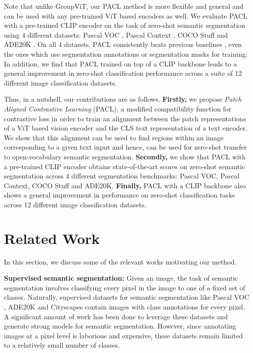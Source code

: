 \documentclass[10pt,twocolumn,letterpaper]{article}
\begin{document}
Note that unlike GroupViT, our PACL method is more flexible and general and can be used with any pre-trained ViT based encoders as well. We evaluate PACL with a pre-trained CLIP encoder on the task of zero-shot semantic segmentation using 4 different datasets: Pascal VOC \cite{Everingham10}, Pascal Context \cite{mottaghi_cvpr14}, COCO Stuff \cite{caesar2018coco} and ADE20K \cite{zhou2017scene}. On all 4 datasets, PACL consistently beats previous baselines \cite{li2022language, ghiasi2021open, liu2022open, xu2022groupvit}, even the ones which use segmentation annotations or segmentation masks for training. In addition, we find that PACL trained on top of a CLIP backbone leads to a general improvement in zero-shot classification performance across a suite of 12 different image classification datasets.

Thus, in a nutshell, our contributions are as follows. \textbf{Firstly,} we propose \emph{Patch Aligned Contrastive Learning} (PACL), a modified compatibility function for contrastive loss in order to train an alignment between the patch representations of a ViT based vision encoder and the CLS text representation of a text encoder. We show that this alignment can be used to find regions within an image corresponding to a given text input and hence, can be used for zero-shot transfer to open-vocabulary semantic segmentation. \textbf{Secondly,} we show that PACL with a pre-trained CLIP encoder obtains state-of-the-art scores on zero-shot semantic segmentation across 4 different segmentation benchmarks: Pascal VOC, Pascal Context, COCO Stuff and ADE20K. \textbf{Finally,} PACL with a CLIP backbone also shows a general improvement in performance on zero-shot classification tasks across 12 different image classification datasets.

\section{Related Work}
\label{sec:related_work}

In this section, we discuss some of the relevant works motivating our method.

\textbf{Supervised semantic segmentation:} Given an image, the task of semantic segmentation \cite{Long_2015_CVPR} involves classifying every pixel in the image to one of a fixed set of classes. Naturally, supervised datasets for semantic segmentation like Pascal VOC \cite{Everingham10}, ADE20K \cite{zhou2017scene} and Cityscapes \cite{cordts2016cityscapes} contain images with class annotations for every pixel. A significant amount of work \cite{ronneberger2015u, chen2017rethinking, wang2020deep, zhao2017pyramid} has been done to leverage these datasets and generate strong models for semantic segmentation. However, since annotating images at a pixel level is laborious and expensive, these datasets remain limited to a relatively small number of classes.
\end{document}
